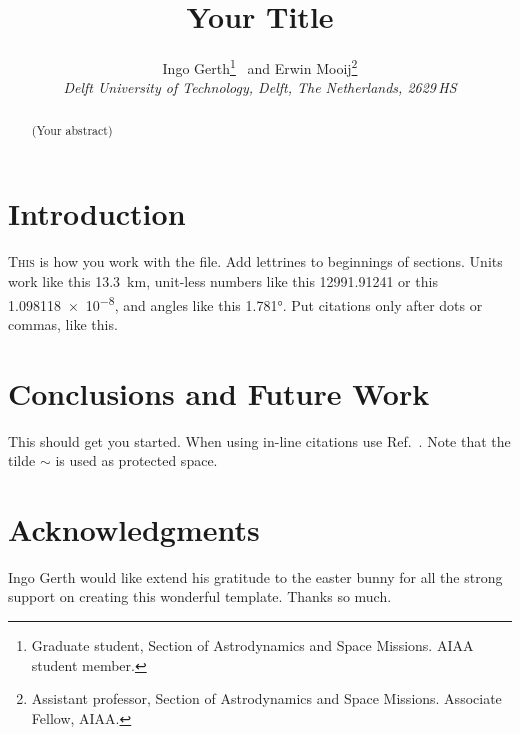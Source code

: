 \documentclass[%
]{aiaa-tc}
\title{Your Title}
\author{
 Ingo Gerth\thanks{%
     Graduate student, Section of Astrodynamics and
     Space Missions. AIAA student member.%
 }
 \ and Erwin Mooij\thanks{Assistant professor, Section of Astrodynamics and Space Missions. Associate
     Fellow, AIAA.}\\
 {\normalsize\itshape
  Delft University of Technology, Delft, The Netherlands, 2629\,HS}
}
\begin{document}



\maketitle

\begin{abstract}
    (Your abstract)
\end{abstract}

\printnomenclature

\section{Introduction}

\lettrine{T}{\textsc{his}} is how you work with the file. Add lettrines to
beginnings of sections. Units work like this \SI{13.3}{km}, unit-less numbers
like this \num{12991.91241} or this \num{1.098118e-8}, and angles like this
\ang{1.781}. Put citations only after dots or commas, like
this.\cite{Acikmese2008}


\section{Conclusions and Future Work}

This should get you started. When using in-line citations use
Ref.~. Note that the tilde $\sim$ is used as protected
space.


\section*{Acknowledgments}

Ingo Gerth would like extend his gratitude to the easter bunny for all the
strong support on creating this wonderful template. Thanks so much.




\end{document}
